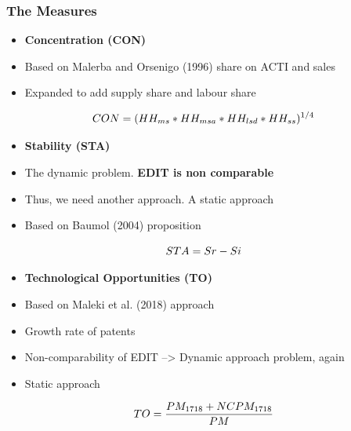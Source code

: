 \documentclass{beamer}
\begin{document}
	\begin{frame}[allowframebreaks]
	\frametitle{The Measures}
	\begin{itemize}
		\item \textbf{Concentration (CON)}
		\item Based on Malerba and Orsenigo (1996) share on ACTI and sales
		\item Expanded to add supply share and labour share
	\end{itemize}
	\begin{equation}
		\centering
		CON = (HH_{ms}*HH_{msa}*HH_{lsd}*HH_{ss})^{1/4}
	\end{equation}
	\framebreak
		\begin{itemize}
		\item \textbf{Stability (STA)}
		\item The dynamic problem.\textbf{ EDIT is non comparable}
		\item Thus, we need another approach. A static approach
		\item Based on Baumol (2004) proposition
	\end{itemize}
	\begin{equation}
		\centering
		STA = Sr - Si
	\end{equation}
	\framebreak
	\begin{itemize}
		\item \textbf{Technological Opportunities (TO)}
		\item Based on Maleki et al. (2018) approach
		\item Growth rate of patents
		\item Non-comparability of EDIT --> Dynamic approach problem, again
		\item Static approach
	\end{itemize}
	\begin{equation}
		\centering
		TO = \dfrac{PM_{1718} + NCPM_{1718}}{PM}
	\end{equation}
	\end{frame}
\end{document}

